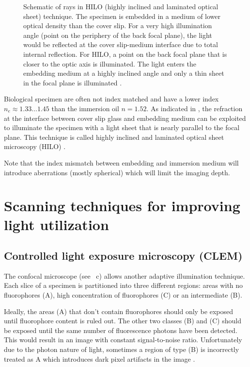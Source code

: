 
\begin{figure}[!hbt]
  \centering
  
  \caption{Schematic of rays in HILO (highly inclined and laminated
    optical sheet) technique. The specimen is embedded in a medium of
    lower optical density than the cover slip. For a very high
    illumination angle (point on the periphery of the back focal
    plane), the light would be reflected at the cover slip-medium
    interface due to total internal reflection. For HILO, a point on
    the back focal plane that is closer to the optic axis is
    illuminated. The light enters the embedding medium at a highly
    inclined angle and only a thin sheet in the focal plane is
    illuminated \citep[inspired from][]{Tokunaga2008}.}
  \label{fig:hilo}
\end{figure}

Biological specimen are often not index matched and have a lower index
$n_e\approx 1.33\ldots1.45$ than the immersion oil $n=1.52$. As
indicated in , the refraction at the interface
between cover slip glass and embedding medium can be exploited to
illuminate the specimen with a light sheet that is nearly parallel to
the focal plane.  This technique is called highly inclined and
laminated optical sheet microscopy (HILO) \citep{Tokunaga2008,
  Konopka2008}.


Note that the index mismatch between embedding and immersion medium
will introduce aberrations (mostly spherical) which will limit the
imaging depth.
\section{Scanning techniques for improving light utilization}
\subsection{Controlled light exposure microscopy (CLEM)}
\label{sec:CLEM}
The confocal microscope (see ~c)
allows another adaptive illumination technique. Each slice of a
specimen is partitioned into three different regions: areas with no
fluorophores (A), high concentration of fluorophores (C) or an
intermediate (B).

Ideally, the areas (A) that don't contain fluorophores should only be
exposed until fluorophore content is ruled out. The other two classes
(B) and (C) should be exposed until the same number of fluorescence
photons have been detected. This would result in an image with
constant signal-to-noise ratio. Unfortunately due to the photon nature
of light, sometimes a region of type (B) is incorrectly treated as A
which introduces dark pixel artifacts in the image
\citep{Hoebe2010}.

